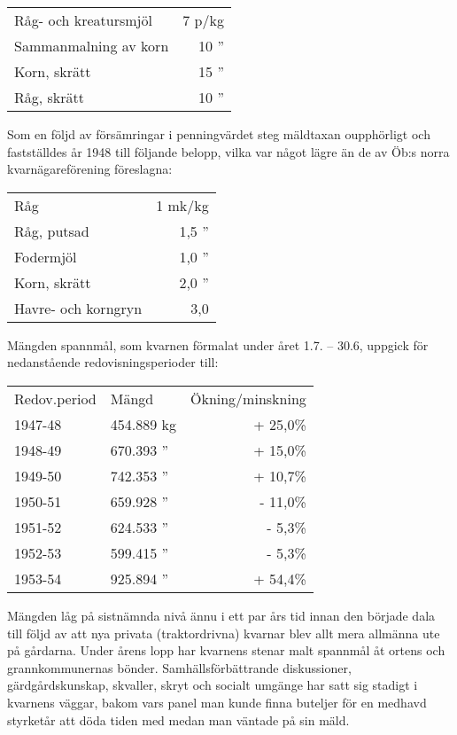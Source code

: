 \begin{center}
  \begin{tabular}{l r}
    \hline
    Råg- och kreatursmjöl & 7  p/kg \\
    Sammanmalning av korn	&	10 '' \\
    Korn, skrätt &	15 '' \\
    Råg, skrätt	&	10 '' \\
    \hline
  \end{tabular}
\end{center}

Som en följd av försämringar i penningvärdet steg mäldtaxan oupphörligt och fastställdes år 1948 till följande belopp, vilka var något lägre än de av Öb:s norra kvarnägareförening föreslagna:

\begin{center}
  \begin{tabular}{l r}
    \hline
    Råg & 1 mk/kg \\
    Råg, putsad & 1,5 '' \\
    Fodermjöl & 1,0 '' \\
    Korn, skrätt & 2,0 '' \\
    Havre- och korngryn & 3,0 \\
    \hline
  \end{tabular}
\end{center}

Mängden spannmål, som kvarnen förmalat under året 1.7. – 30.6, uppgick för nedanstående redovisningsperioder till:

\begin{center}
  \begin{tabular}{l l r}
    \hline
    Redov.period & Mängd & Ökning/minskning \\
    1947-48	&	454.889 kg & + 25,0\% \\
    1948-49	&	670.393 '' & + 15,0\% \\
    1949-50	&	742.353 '' & + 10,7\% \\
    1950-51	&	659.928 '' & - 11,0\% \\
    1951-52	&	624.533 '' & -  5,3\% \\
    1952-53	&	599.415 '' & -  5,3\% \\
    1953-54	&	925.894 '' & + 54,4\% \\
    \hline
  \end{tabular}
\end{center}

Mängden låg på sistnämnda nivå ännu i ett par års tid innan den började dala till följd av att nya privata (traktordrivna) kvarnar blev allt mera allmänna ute på gårdarna. Under årens lopp har kvarnens stenar malt spannmål åt ortens och grannkommunernas bönder. Samhällsförbättrande diskussioner, gärdgårdskunskap, skvaller, skryt och socialt umgänge har satt sig stadigt i kvarnens väggar, bakom vars panel man kunde finna buteljer för en medhavd styrketår att döda tiden med medan man väntade på sin mäld.

